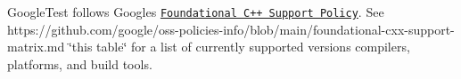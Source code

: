 Google\+Test follows Google\textquotesingle{}s \href{https://opensource.google/documentation/policies/cplusplus-support}{\tt Foundational C++ Support Policy}. See https\+://github.com/google/oss-\/policies-\/info/blob/main/foundational-\/cxx-\/support-\/matrix.\+md \char`\"{}this table\char`\"{} for a list of currently supported versions compilers, platforms, and build tools. 